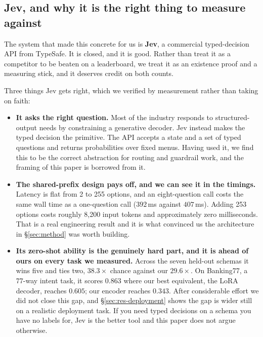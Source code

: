 \subsection{Jev, and why it is the right thing to measure against}
\label{sec:intro-jev}

The system that made this concrete for us is \textbf{Jev}, a commercial
typed-decision API from TypeSafe. It is closed, and it is good. Rather
than treat it as a competitor to be beaten on a leaderboard, we treat it
as an existence proof and a measuring stick, and it deserves credit on
both counts.

Three things Jev gets right, which we verified by measurement rather than
taking on faith:

\begin{itemize}[leftmargin=1.4em,itemsep=0.3em]
  \item \textbf{It asks the right question.} Most of the industry responds
    to structured-output needs by constraining a generative decoder. Jev
    instead makes the typed decision the primitive. The API accepts a
    state and a set of typed questions and returns probabilities over
    fixed menus. Having used it, we find this to be the correct
    abstraction for routing and guardrail work, and the framing of this
    paper is borrowed from it.
  \item \textbf{The shared-prefix design pays off, and we can see it in
    the timings.} Latency is flat from 2 to 255 options, and an
    eight-question call costs the same wall time as a one-question call
    ($392$\,ms against $407$\,ms). Adding 253 options costs roughly 8{,}200
    input tokens and approximately zero milliseconds. That is a real
    engineering result and it is what convinced us the architecture in
    \S\ref{sec:method} was worth building.
  \item \textbf{Its zero-shot ability is the genuinely hard part, and it
    is ahead of ours on every task we measured.} Across the seven
    held-out schemas it wins five and ties two, $38.3\times$ chance
    against our $29.6\times$. On Banking77, a 77-way intent task, it
    scores $0.863$ where our best equivalent, the LoRA decoder, reaches
    $0.605$; our encoder reaches $0.343$. After considerable effort we
    did not close this gap, and
    \S\ref{sec:res-deployment} shows the gap is wider still on a realistic
    deployment task. If you need typed decisions on a schema you have no
    labels for, Jev is the better tool and this paper does not argue
    otherwise.
\end{itemize}

